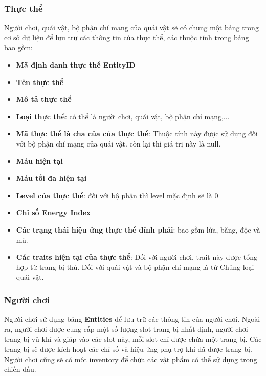 \subsubsection{Thực thể}
\hspace*{0.5cm} Người chơi, quái vật, bộ phận chí mạng của quái vật sẽ có chung một bảng trong cơ sở dữ liệu để lưu trữ các thông tin của thực thể, các thuộc tính trong bảng bao gồm:\\
\begin{itemize}
	\item \textbf{Mã định danh thực thể EntityID}
	\item \textbf{Tên thực thể}
	\item \textbf{Mô tả thực thể}
	\item \textbf{Loại thực thể}: có thể là người chơi, quái vật, bộ phận chí mạng,...
	\item \textbf{Mã thực thể là cha của của thực thể}: Thuộc tính này được sử dụng đối với bộ phận chí mạng của quái vật. còn lại thì giá trị này là null.
	\item \textbf{Máu hiện tại}
	\item \textbf{Máu tối đa hiện tại}
	\item \textbf{Level của thực thể}: đối với bộ phận thì level mặc định sẽ là 0
	\item \textbf{Chỉ số Energy Index}
	\item \textbf{Các trạng thái hiệu ứng thực thể dính phải}: bao gồm lửa, băng, độc và mù.
	\item \textbf{Các traits hiện tại của thực thể}: Đối với người chơi, trait này được tổng hợp từ trang bị thủ. Đối với quái vật và bộ phận chí mạng là từ Chủng loại quái vật.
\end{itemize}

\subsubsection{Người chơi}
\hspace*{0.5cm} Người chơi sử dụng bảng \textbf{Entities} để lưu trữ các thông tin của người chơi. Ngoài ra, người chơi được cung cấp một số lượng slot trang bị nhất định, người chơi trang bị vũ khí và giáp vào các slot này, mỗi slot chỉ được chứa một trang bị. Các trang bị sẽ được kích hoạt các chỉ số và hiệu ứng phụ trợ khi đã được trang bị. Người chơi cũng sẽ có môt inventory để chứa các vật phẩm có thể sử dụng trong chiến đấu.\\

